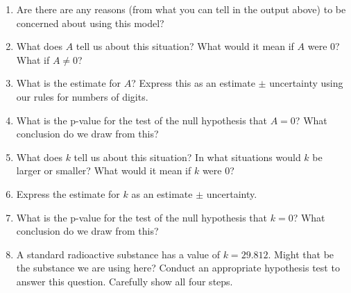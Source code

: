 \documentclass[twoside]{book}\usepackage[]{graphicx}\usepackage[]{xcolor}
\newenvironment{knitrout}{}{} %
\begin{document}
\begin{problem}
\begin{knitrout}
{}



\end{knitrout}
\begin{enumerate}
	\item
		Are there are any reasons (from what you can tell in the output
		above) to be concerned about using this model?
	\item
		What does $A$ tell us about this situation?  
		What would it mean if $A$ were 0?  What if $A \neq 0$?
\item
	What is the estimate for $A$?  Express this as an estimate $\pm$ uncertainty
	using our rules for numbers of digits.
\item
	What is the p-value for the test of the null hypothesis that $A=0$?
	What conclusion do we draw from this?
\item
	What does $k$ tell us about this situation?  In what situations would $k$
	be larger or smaller?  What would it mean if $k$ were 0?

	\item
		Express the estimate for $k$ as an estimate $\pm$ uncertainty.
\item
	What is the p-value for the test of the null hypothesis that $k=0$?
	What conclusion do we draw from this?
\item
A standard radioactive substance has a value of $k=29.812$.  Might that be the
substance we are using here?  Conduct an appropriate hypothesis test to answer
this question.  Carefully show all four steps.
\end{enumerate}
\end{problem}
\end{document}

